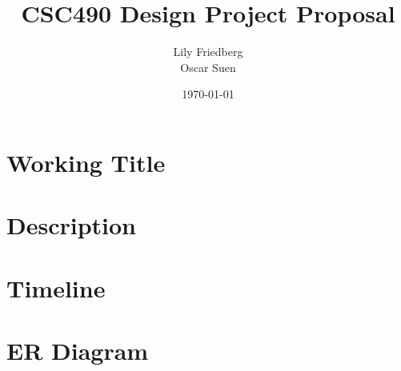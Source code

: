 \documentclass[12pt]{article}
\title{CSC490 Design Project Proposal}
\author{Lily Friedberg \\ Oscar Suen}
\date{\today}
\begin{document}
\section{Working Title}
\section{Description}
\section{Timeline}
\section{ER Diagram}
\end{document}
